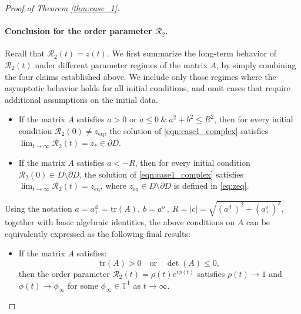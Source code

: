 \documentclass[10pt]{article}
\theoremstyle{definition}
\theoremstyle{definition}
\numberwithin{equation}{section}
\newcommand{\BBT}{\mathbb{T}}
\newcommand{\CR}{\mathcal{R}}
\newcommand{\aDPlus}{a_+^{\text{d}}}
\newcommand{\aDMinus}{a_-^{\text{d}}}
\newcommand{\aOPlus}{a_+^{\text{o}}}
\newcommand{\aOMinus}{a_-^{\text{o}}}
\newcommand{\tr}[1]{\mathrm{tr}(#1)}
\newcommand{\zeq}{z_{\mathrm{eq}}}
\begin{document}
\begin{proof}[Proof of Theorem \ref{thm:case_1}]
\paragraph{Conclusion for the order parameter $\CR_2$.}
Recall that $\CR_2(t) = z(t)$.
We first summarize the long-term behavior of  $\CR_2(t)$ under different parameter regimes of the matrix $A$, by simply combining the four claims established above.
We include only those regimes where the asymptotic behavior holds for all initial conditions, and omit cases that require additional assumptions on the initial data.
\begin{itemize}
    \item If the matrix $A$ satisfies $a > 0$ or $a \leq 0 \ \& \ a^2 + b^2 \leq R^2$,
    then for every initial condition $\CR_2(0) \neq \zeq$, the solution of \eqref{eqn:case1_complex} satisfies $\lim_{t \rightarrow \infty} \CR_2 (t) =  z_* \in \partial D$.

\item If the matrix $A$ satisfies $a < - R$,
then for every initial condition $\CR_2(0) \in D \setminus \partial D$, the solution of \eqref{eqn:case1_complex} satisfies $\lim_{t \rightarrow \infty} \CR_2(t) = \zeq$, where $\zeq \in D \setminus \partial D$ is defined in \eqref{eq:zeq}.
\end{itemize}

Using the notation $a = \aDPlus = \tr{A}, \ b = \aOMinus, \ R = |c| = \sqrt{(\aDMinus)^2 + (\aOPlus)^2}$, together with basic algebraic identities, the above conditions on $A$ can be equivalently expressed as the following final results:
\begin{itemize}
    \item If the matrix $A$ satisfies:
    \begin{equation*}
        \tr{A} > 0 \quad \text{or} \quad  \det(A) \leq 0,
    \end{equation*}
    then the order parameter $\CR_2(t) = \rho(t) e^{i\phi(t)}$ satisfies $\rho(t) \rightarrow 1$ and $\phi(t) \rightarrow \phi_{\infty}$ for some $\phi_{\infty} \in \BBT^1$ as $t \rightarrow \infty$.
    

\end{itemize}
\end{proof}
\end{document}
